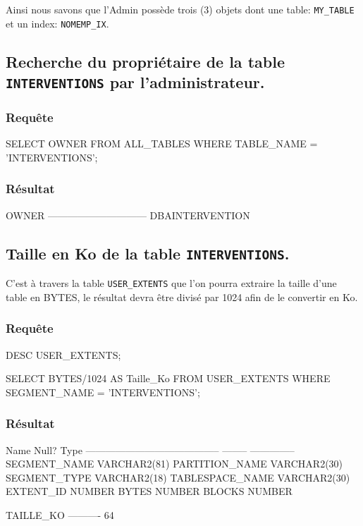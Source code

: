 \documentclass[•]{article}
\begin{document}
Ainsi nous savons que l'Admin possède trois (3) objets dont une table: \texttt{MY\_TABLE} et un index: \texttt{NOMEMP\_IX}. 

\subsection{Recherche du propriétaire de la table \texttt{INTERVENTIONS} par l'administrateur.}
\subsubsection{Requête}
\begin{sql}
SELECT OWNER 
FROM ALL_TABLES 
WHERE TABLE_NAME = 'INTERVENTIONS';
\end{sql}
\subsubsection{Résultat}
\begin{sql}
OWNER
------------------------------
DBAINTERVENTION
\end{sql}

\subsection{Taille en Ko de la table \texttt{INTERVENTIONS}.}
C'est à travers la table \texttt{USER\_EXTENTS} que l'on pourra extraire la taille d'une table en BYTES, le résultat devra être divisé par 1024 afin de le convertir en Ko.  

\subsubsection{Requête}
\begin{sql}
DESC USER_EXTENTS;

SELECT BYTES/1024 AS Taille_Ko 
FROM USER_EXTENTS 
WHERE SEGMENT_NAME = 'INTERVENTIONS';
\end{sql}

\subsubsection{Résultat}
\begin{sql}
  Name                                      Null?    Type
 ----------------------------------------- -------- --------------
 SEGMENT_NAME                                       VARCHAR2(81)
 PARTITION_NAME                                     VARCHAR2(30)
 SEGMENT_TYPE                                       VARCHAR2(18)
 TABLESPACE_NAME                                    VARCHAR2(30)
 EXTENT_ID                                          NUMBER
 BYTES                                              NUMBER
 BLOCKS                                             NUMBER

 TAILLE_KO
----------
        64
\end{sql}
\end{document}
